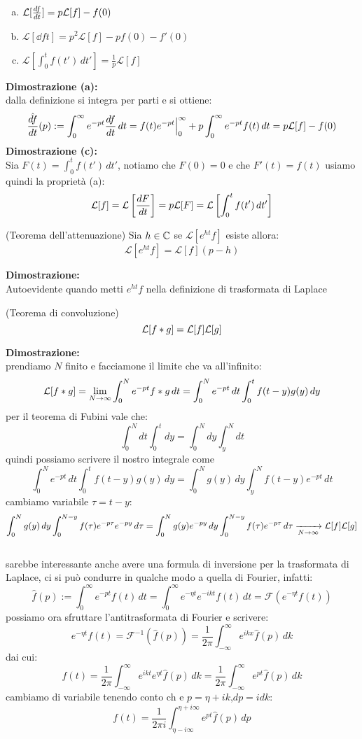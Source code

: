\begin{enumerate}[a)]
\item $\mathcal{L}[\frac{d f}{d t}] = p\mathcal{L}[f]-f(0)$
\item $\mathcal{L}[\dd{f}{t}] = p^2\mathcal{L}[f]-pf(0)-f'(0)$
\item $\mathcal{L}[\int_0^t f(t')\,dt'] = \frac{1}{p}\mathcal{L}[f]$
\end{enumerate}
\textbf{Dimostrazione (a):}\\
dalla definizione si integra per parti e si ottiene:
\[\hat{\frac{d f}{d t}}(p) := \int_0^\infty e^{-pt}\frac{d f}{d t}\,dt =  f(t)e^{-pt}\Big|_0^\infty + p\int_0^\infty e^{-pt} f(t)\,dt = p\mathcal{L}[f]-f(0)  \]
\textbf{Dimostrazione (c):}\\
Sia $F(t) = \int_0^t f(t')\,dt'$, notiamo che $F(0) = 0$ e che $F'(t) = f(t)$ usiamo quindi la proprietà (a):
\[\mathcal{L}[f] = \mathcal{L}\left[\frac{d F}{d t}\right] = p\mathcal{L}[F] = \mathcal{L}\left[\int_0^t f(t')\,dt'\right]    \]
\begin{thm}
(Teorema dell'attenuazione) Sia $h\in\mathbb{C}$ se $\mathcal{L}[e^{ht}f]$ esiste allora:
\[\mathcal{L}[e^{ht}f] = \mathcal{L}[f](p-h)  \]
\end{thm}
\hspace{-1.6em}\textbf{Dimostrazione:}\\
Autoevidente quando metti $e^{ht}f$ nella definizione di trasformata di Laplace
\begin{thm}
(Teorema di convoluzione) 
\[\mathcal{L}[f*g] = \mathcal{L}[f]\mathcal{L}[g]\]
\end{thm}
\hspace{-1.6em}\textbf{Dimostrazione:}\\
prendiamo $N$ finito e facciamone il limite che va all'infinito:
\[\mathcal{L}[f*g] = \lim_{N\to\infty}\int_0^N e^{-pt}f*g\,dt = \int_0^N e^{-pt}\,dt\int_0^t f(t-y)g(y)\,dy\]
per il teorema di Fubini vale che:
\[\int_0^Ndt\int_0^tdy = \int_0^Ndy\int_y^Ndt\]
quindi possiamo scrivere il nostro integrale come
\[\int_0^N e^{-pt}\,dt\int_0^t f(t-y)g(y)\,dy = \int_0^N g(y)\,dy\int_y^N f(t-y)e^{-pt}\,dt\]
cambiamo variabile $\tau = t-y$:
\[ \int_0^N g(y)\,dy\int_0^{N-y} f(\tau)e^{-p\tau}e^{-py}\,d\tau = \int_0^N g(y)e^{-py}\,dy\int_0^{N-y} f(\tau)e^{-p\tau}\,d\tau \xrightarrow[N\to \infty]{} \mathcal{L}[f]\mathcal{L}[g] \]
\\
sarebbe interessante anche avere una formula di inversione per la trasformata di Laplace, ci si può condurre in qualche modo a quella di Fourier, infatti:
\[ \hat{f}(p) := \int_0^\infty e^{-pt} f(t)\,dt =  \int_0^\infty e^{-\eta t}e^{-ikt} f(t)\,dt = \mathcal{F}(e^{-\eta t}f(t))  \]
possiamo ora sfruttare l'antitrasformata di Fourier e scrivere:
\[e^{-\eta t}f(t) = \mathcal{F}^{-1}(\hat{f}(p)) = \frac{1}{2\pi}\int_{-\infty}^\infty e^{ikx}\hat{f}(p)\,dk\]
dai cui:
\[f(t) = \frac{1}{2\pi}\int_{-\infty}^\infty e^{ikt}e^{\eta t}\hat{f}(p)\,dk = \frac{1}{2\pi}\int_{-\infty}^\infty e^{pt}\hat{f}(p)\,dk\]
cambiamo di variabile tenendo conto ch e $p = \eta + ik$,$dp = idk$:
\[f(t) = \frac{1}{2\pi i }\int_{\eta-i\infty}^{\eta+i\infty} e^{pt}\hat{f}(p)\,dp\]

